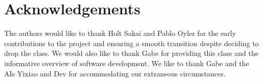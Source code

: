 \documentclass{article}
\begin{document}
\section{Acknowledgements}
The authors would like to thank Holt Sakai and Pablo Oyler for the early contributions to the project and ensuring a smooth transition despite deciding to drop the class.  We would also like to thank Gabe for providing this class and the informative overview of software development.  We like to thank Gabe and the AIs Yixiao and Dev for accommodating our extraneous circumstances.
\end{document}
